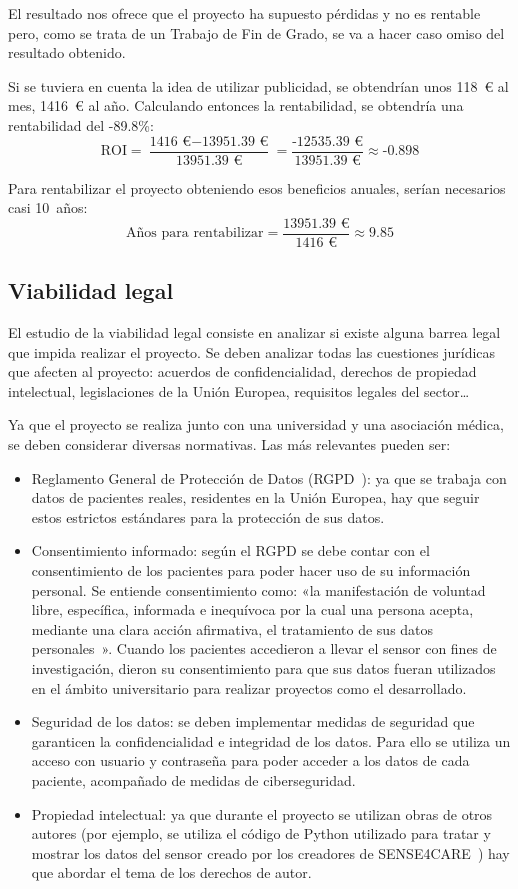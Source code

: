 El resultado nos ofrece que el proyecto ha supuesto pérdidas y no es rentable pero, como se trata de un Trabajo de Fin de Grado, se va a hacer caso omiso del resultado obtenido.

Si se tuviera en cuenta la idea de utilizar publicidad, se obtendrían unos 118~€ al mes, 1416~€ al año. Calculando entonces la rentabilidad, se obtendría una rentabilidad del -89.8\%:
$$\text{ROI} = \frac{\text{1416 €} - \text{13951.39 €}}{\text{13951.39 €}} = \frac{\text{-12535.39 €}}{\text{13951.39 €}} \approx \text{-0.898}$$

Para rentabilizar el proyecto obteniendo esos beneficios anuales, serían necesarios casi 10~años:
$$\text{Años para rentabilizar} = \frac{\text{13951.39 €}}{\text{1416 €}} \approx \text{9.85}$$



\subsection{Viabilidad legal}
El estudio de la viabilidad legal consiste en analizar si existe alguna barrea legal que impida realizar el proyecto. Se deben analizar todas las cuestiones jurídicas que afecten al proyecto: acuerdos de confidencialidad, derechos de propiedad intelectual, legislaciones de la Unión Europea, requisitos legales del sector\ldots

Ya que el proyecto se realiza junto con una universidad y una asociación médica, se deben considerar diversas normativas. Las más relevantes pueden ser:
\begin{itemize}
    \item Reglamento General de Protección de Datos (RGPD~\cite{RGPD}): ya que se trabaja con datos de pacientes reales, residentes en la Unión Europea, hay que seguir estos estrictos estándares para la protección de sus datos.
    \item Consentimiento informado: según el RGPD se debe contar con el consentimiento de los pacientes para poder hacer uso de su información personal. Se entiende consentimiento como: «la manifestación de voluntad libre, específica, informada e inequívoca por la cual una persona acepta, mediante una clara acción afirmativa, el tratamiento de sus datos personales~\cite{consentimiento}». Cuando los pacientes accedieron a llevar el sensor con fines de investigación, dieron su consentimiento para que sus datos fueran utilizados en el ámbito universitario para realizar proyectos como el desarrollado.
    \item Seguridad de los datos: se deben implementar medidas de seguridad que garanticen la confidencialidad e integridad de los datos. Para ello se utiliza un acceso con usuario y contraseña para poder acceder a los datos de cada paciente, acompañado de medidas de ciberseguridad.
    \item Propiedad intelectual: ya que durante el proyecto se utilizan obras de otros autores (por ejemplo, se utiliza el código de Python utilizado para tratar y mostrar los datos del sensor creado por los creadores de SENSE4CARE~\cite{sense4care}) hay que abordar el tema de los derechos de autor.
\end{itemize}

